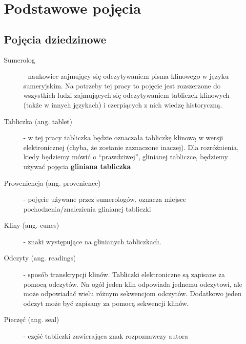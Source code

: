 \chapter{Podstawowe pojęcia}\label{r:pojecia}
\section{Pojęcia dziedzinowe}
\begin{description}
 \item[Sumerolog] - naukowiec zajmujący się odczytywaniem pisma klinowego w języku sumeryjskim. Na potrzeby tej pracy
		      to pojęcie jest rozszerzone do wszystkich ludzi zajmujących się odczytywaniem tabliczek klinowych (także w innych językach) i czerpiących z nich wiedzę historyczną.
 \item[Tabliczka (ang. tablet)] - w tej pracy tabliczka będzie oznaczała tabliczkę klinową w wersji elektronicznej 
		  (chyba, że zostanie zaznaczone inaczej). Dla rozróżnienia, kiedy będziemy mówić o ``prawdziwej'', 
		  glinianej tabliczce, będziemy używać pojęcia \textbf{gliniana tabliczka}
 \item[Proweniencja (ang. provenience)] - pojęcie używane przez sumerologów, oznacza miejsce pochodzenia/znalezienia glinianej tabliczki
 \item[Kliny (ang. cunes)] - znaki występujące na glinianych tabliczkach.
 \item[Odczyty (ang. readings)] - sposób transkrypcji klinów. Tabliczki elektroniczne są zapisane za pomocą odczytów. 
Na ogół jeden klin odpowiada jednemu odczytowi, ale może odpowiadać wielu różnym sekwencjom odczytów. 
Dodatkowo jeden odczyt może być zapisany za pomocą sekwencji klinów.
 \item[Pieczęć (ang. seal)] - część tabliczki zawierająca znak rozpoznawczy autora
\end{description}

